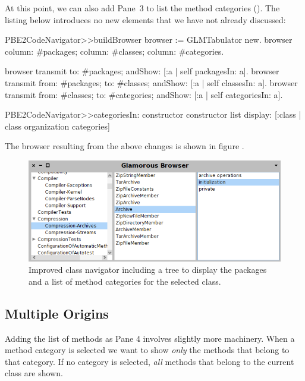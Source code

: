 \documentclass[a4paper,10pt,twoside]{book}
\begin{document}
At this point, we can also add Pane~3 to list the method categories (). The listing
below introduces no new elements that we have not already discussed:

\begin{code}{}
PBE2CodeNavigator>>buildBrowser 
  browser := GLMTabulator new.
  browser
    column: #packages;
    column: #classes;
    column: #categories. 

  browser transmit to: #packages; andShow: [:a | self packagesIn: a].
  browser transmit from: #packages; to: #classes; andShow: [:a | self classesIn: a].
  browser transmit from: #classes; to: #categories; andShow: [:a | self categoriesIn: a].

PBE2CodeNavigator>>categoriesIn: constructor
  constructor list
    display:  [:class | class organization categories]  
\end{code}


The browser resulting from the above changes is shown in
figure .

\begin{figure}[htbp]
\centerline{\includegraphics[width=\linewidth]{treeandcategories.png}}
\caption{Improved class navigator including a tree to display the packages and a list of method categories for the selected class.}
\label{fig:treeandcategories}
\end{figure}


\subsection{Multiple Origins}

Adding the list of methods as Pane 4 involves slightly more machinery. 
When a method category is selected we want to show \emph{only} the methods
that belong to that category. If no category is selected, \emph{all} methods that belong to the current class are shown.
\end{document}
